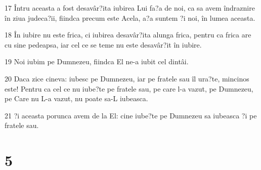 \par 17 Întru aceasta a fost desavâr?ita iubirea Lui fa?a de noi, ca sa avem îndraznire în ziua judeca?ii, fiindca precum este Acela, a?a suntem ?i noi, în lumea aceasta.
\par 18 În iubire nu este frica, ci iubirea desavâr?ita alunga frica, pentru ca frica are cu sine pedeapsa, iar cel ce se teme nu este desavâr?it în iubire.
\par 19 Noi iubim pe Dumnezeu, fiindca El ne-a iubit cel dintâi.
\par 20 Daca zice cineva: iubesc pe Dumnezeu, iar pe fratele sau îl ura?te, mincinos este! Pentru ca cel ce nu iube?te pe fratele sau, pe care l-a vazut, pe Dumnezeu, pe Care nu L-a vazut, nu poate sa-L iubeasca.
\par 21 ?i aceasta porunca avem de la El: cine iube?te pe Dumnezeu sa iubeasca ?i pe fratele sau.

\chapter{5}

